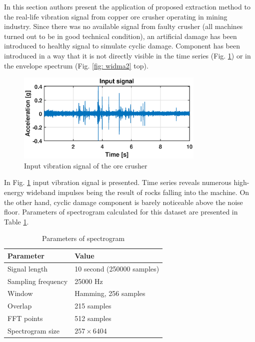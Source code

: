 \documentclass[preprint,12pt]{elsarticle}
\begin{document}
In this section authors present the application of proposed extraction method to the real-life vibration signal from copper ore crusher operating in mining industry. Since there was no available signal from faulty crusher (all machines turned out to be in good technical condition), an artificial damage has been introduced to healthy signal to simulate cyclic damage. Component has been introduced in a way that it is not directly visible in the time series (Fig. \ref{fig: input2}) or in the envelope spectrum (Fig. \ref{fig: widma2} top).

\begin{figure}[!ht]
\centering
\includegraphics[width = 0.8\textwidth]{figs3/input.eps}
\caption{Input vibration signal of the ore crusher}
\label{fig: input2}
\end{figure}

In Fig. \ref{fig: input2} input vibration signal is presented. Time series reveals numerous high-energy wideband impulses being the result of rocks falling into the machine. On the other hand, cyclic damage component is barely noticeable above the noise floor. Parameters of spectrogram calculated for this dataset are presented in Table \ref{tab:tab2}.


\begin{table}[ht!]
    \centering
    \caption{Parameters of spectrogram}
  \begin{tabular}{|l|l|}
    \hline
    \textbf{Parameter} & \textbf{Value} \\ \hline
         Signal length & 10 second (250000 samples) \\ \hline
         Sampling frequency & 25000 Hz \\ \hline
         Window & Hamming, 256 samples \\ \hline
         Overlap & 215 samples \\ \hline
         FFT points & 512 samples \\ \hline
         Spectrogram size & $257 \times 6404$ \\
         
    \hline
    \end{tabular}
    \label{tab:tab2}
\end{table}
\end{document}
